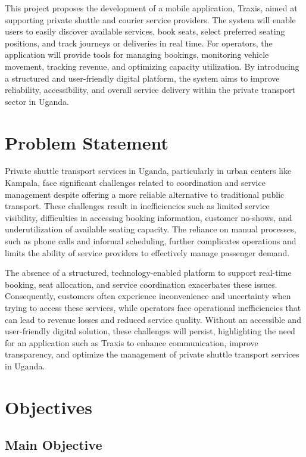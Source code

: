 This project proposes the development of a mobile application, Traxis, aimed at
supporting private shuttle and courier service providers. The system will enable
users to easily discover available services, book seats, select preferred
seating positions, and track journeys or deliveries in real time. For operators,
the application will provide tools for managing bookings, monitoring vehicle
movement, tracking revenue, and optimizing capacity utilization. By introducing
a structured and user-friendly digital platform, the system aims to improve
reliability, accessibility, and overall service delivery within the private
transport sector in Uganda.


\section{Problem Statement}
Private shuttle transport services in Uganda, particularly in urban centers like
Kampala, face significant challenges related to coordination and service
management despite offering a more reliable alternative to traditional public
transport. These challenges result in inefficiencies such as limited service
visibility, difficulties in accessing booking information, customer no-shows,
and underutilization of available seating capacity. The reliance on manual
processes, such as phone calls and informal scheduling, further complicates
operations and limits the ability of service providers to effectively manage
passenger demand.


The absence of a structured, technology-enabled platform to support real-time
booking, seat allocation, and service coordination exacerbates these issues.
Consequently, customers often experience inconvenience and uncertainty when
trying to access these services, while operators face operational inefficiencies
that can lead to revenue losses and reduced service quality. Without an
accessible and user-friendly digital solution, these challenges will persist,
highlighting the need for an application such as Traxis to enhance
communication, improve transparency, and optimize the management of private
shuttle transport services in Uganda. \vspace{1cm}

\section{Objectives}
\subsection{Main Objective}

